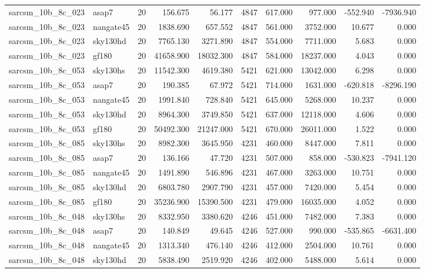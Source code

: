 \begin{tabular}{llrrrrrrrr}
sarcsm\_10b\_8c\_023 & asap7 & 20 & 156.675 & 56.177 & 4847 & 617.000 & 977.000 & -552.940 & -7936.940 \\
sarcsm\_10b\_8c\_023 & nangate45 & 20 & 1838.690 & 657.552 & 4847 & 561.000 & 3752.000 & 10.677 & 0.000 \\
sarcsm\_10b\_8c\_023 & sky130hd & 20 & 7765.130 & 3271.890 & 4847 & 554.000 & 7711.000 & 5.683 & 0.000 \\
sarcsm\_10b\_8c\_023 & gf180 & 20 & 41658.900 & 18032.300 & 4847 & 584.000 & 18237.000 & 4.043 & 0.000 \\
sarcsm\_10b\_8c\_053 & sky130hs & 20 & 11542.300 & 4619.380 & 5421 & 621.000 & 13042.000 & 6.298 & 0.000 \\
sarcsm\_10b\_8c\_053 & asap7 & 20 & 190.385 & 67.972 & 5421 & 714.000 & 1631.000 & -620.818 & -8296.190 \\
sarcsm\_10b\_8c\_053 & nangate45 & 20 & 1991.840 & 728.840 & 5421 & 645.000 & 5268.000 & 10.237 & 0.000 \\
sarcsm\_10b\_8c\_053 & sky130hd & 20 & 8964.300 & 3749.850 & 5421 & 637.000 & 12118.000 & 4.606 & 0.000 \\
sarcsm\_10b\_8c\_053 & gf180 & 20 & 50492.300 & 21247.000 & 5421 & 670.000 & 26011.000 & 1.522 & 0.000 \\
sarcsm\_10b\_8c\_085 & sky130hs & 20 & 8982.300 & 3645.950 & 4231 & 460.000 & 8447.000 & 7.811 & 0.000 \\
sarcsm\_10b\_8c\_085 & asap7 & 20 & 136.166 & 47.720 & 4231 & 507.000 & 858.000 & -530.823 & -7941.120 \\
sarcsm\_10b\_8c\_085 & nangate45 & 20 & 1491.890 & 546.896 & 4231 & 467.000 & 3263.000 & 10.751 & 0.000 \\
sarcsm\_10b\_8c\_085 & sky130hd & 20 & 6803.780 & 2907.790 & 4231 & 457.000 & 7420.000 & 5.454 & 0.000 \\
sarcsm\_10b\_8c\_085 & gf180 & 20 & 35236.900 & 15390.500 & 4231 & 479.000 & 16035.000 & 4.052 & 0.000 \\
sarcsm\_10b\_8c\_048 & sky130hs & 20 & 8332.950 & 3380.620 & 4246 & 451.000 & 7482.000 & 7.383 & 0.000 \\
sarcsm\_10b\_8c\_048 & asap7 & 20 & 140.849 & 49.645 & 4246 & 527.000 & 990.000 & -535.865 & -6631.400 \\
sarcsm\_10b\_8c\_048 & nangate45 & 20 & 1313.340 & 476.140 & 4246 & 412.000 & 2504.000 & 10.761 & 0.000 \\
sarcsm\_10b\_8c\_048 & sky130hd & 20 & 5838.490 & 2519.920 & 4246 & 402.000 & 5488.000 & 5.614 & 0.000 \\

\end{tabular}
